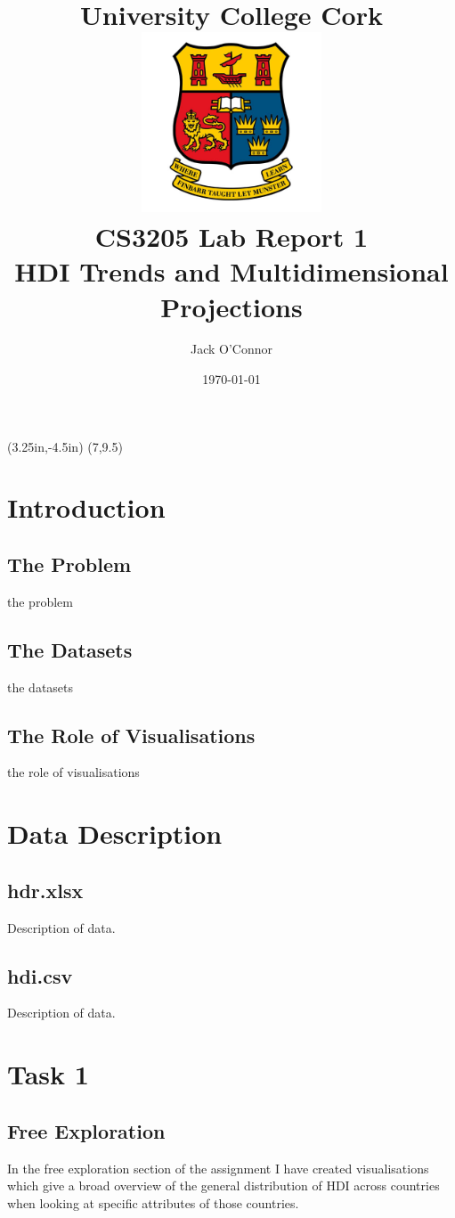 \documentclass[11pt,a4paper,final]{article}
\title{ \vspace{3.5cm}
	University College Cork \\ [1cm]
	\includegraphics[width=0.4\textwidth]{ucc_crest} \\ [1cm]
	CS3205 Lab Report 1 \\ [0.5cm]
	HDI Trends and Multidimensional Projections
}
\author{Jack O'Connor}
\date{\today}
\begin{document}
\thisfancyput(3.25in,-4.5in){%
  \setlength{\unitlength}{1in}\fancyoval(7,9.5)}%
\maketitle
\pagebreak
{
\hypersetup{hidelinks}
\tableofcontents
}
\pagebreak
\setcounter{page}{1}

\begin{multicols}{2}
\section{Introduction}
\subsection{The Problem}
the problem

\subsection{The Datasets}
the datasets

\subsection{The Role of Visualisations}
the role of visualisations


\section{Data Description}
\subsection{hdr.xlsx}
Description of data.
\subsection{hdi.csv}
Description of data.


\section{Task 1}
\subsection{Free Exploration}
In the free exploration section of the assignment I have created visualisations which give a broad overview of the general distribution of HDI across countries when looking at specific attributes of those countries.


\end{multicols}
\end{document}
